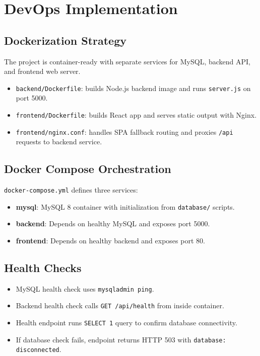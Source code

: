 \chapter{DevOps Implementation}

\section{Dockerization Strategy}
The project is container-ready with separate services for MySQL, backend API, and frontend web server.

\begin{itemize}[leftmargin=1.3cm]
\item \texttt{backend/Dockerfile}: builds Node.js backend image and runs \texttt{server.js} on port 5000.
\item \texttt{frontend/Dockerfile}: builds React app and serves static output with Nginx.
\item \texttt{frontend/nginx.conf}: handles SPA fallback routing and proxies \texttt{/api} requests to backend service.
\end{itemize}

\section{Docker Compose Orchestration}
\texttt{docker-compose.yml} defines three services:
\begin{itemize}[leftmargin=1.3cm]
\item \textbf{mysql}: MySQL 8 container with initialization from \texttt{database/} scripts.
\item \textbf{backend}: Depends on healthy MySQL and exposes port 5000.
\item \textbf{frontend}: Depends on healthy backend and exposes port 80.
\end{itemize}

\section{Health Checks}
\begin{itemize}[leftmargin=1.3cm]
\item MySQL health check uses \texttt{mysqladmin ping}.
\item Backend health check calls \texttt{GET /api/health} from inside container.
\item Health endpoint runs \texttt{SELECT 1} query to confirm database connectivity.
\item If database check fails, endpoint returns HTTP 503 with \texttt{database: disconnected}.
\end{itemize}

